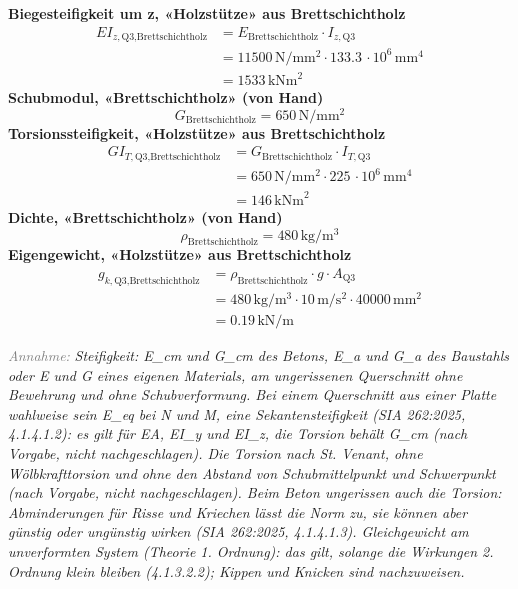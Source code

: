 \documentclass[11pt,a4paper]{article}
\newcommand{\hinweis}[2]{\par\noindent\textcolor{gray}{\textit{#1:}} \textit{#2}\par}
\begin{document}
\noindent\textbf{Biegesteifigkeit um z, «Holzstütze» aus Brettschichtholz}
\begin{equation*}
\begin{aligned}
  EI_{z,\text{Q3,Brettschichtholz}} &= E_{\text{Brettschichtholz}} \cdot I_{z,\text{Q3}} \\
  &= 11500\,\mathrm{N}/\mathrm{mm}^{2} \cdot 133.3\,\cdot 10^{6}\,\mathrm{mm}^{4} \\
  &= 1533\,\mathrm{kNm}^{2}
\end{aligned}
\end{equation*}
\noindent\textbf{Schubmodul, «Brettschichtholz» (von Hand)}
\begin{equation*}
G_{\text{Brettschichtholz}} = 650\,\mathrm{N}/\mathrm{mm}^{2}
\end{equation*}
\noindent\textbf{Torsionssteifigkeit, «Holzstütze» aus Brettschichtholz}
\begin{equation*}
\begin{aligned}
  GI_{T,\text{Q3,Brettschichtholz}} &= G_{\text{Brettschichtholz}} \cdot I_{T,\text{Q3}} \\
  &= 650\,\mathrm{N}/\mathrm{mm}^{2} \cdot 225\,\cdot 10^{6}\,\mathrm{mm}^{4} \\
  &= 146\,\mathrm{kNm}^{2}
\end{aligned}
\end{equation*}
\noindent\textbf{Dichte, «Brettschichtholz» (von Hand)}
\begin{equation*}
\rho_{\text{Brettschichtholz}} = 480\,\mathrm{kg}/\mathrm{m}^{3}
\end{equation*}
\noindent\textbf{Eigengewicht, «Holzstütze» aus Brettschichtholz}
\begin{equation*}
\begin{aligned}
  g_{k,\text{Q3,Brettschichtholz}} &= \rho_{\text{Brettschichtholz}} \cdot g \cdot A_{\text{Q3}} \\
  &= 480\,\mathrm{kg}/\mathrm{m}^{3} \cdot 10\,\mathrm{m}/\mathrm{s}^{2} \cdot 40000\,\mathrm{mm}^{2} \\
  &= 0.19\,\mathrm{kN}/\mathrm{m}
\end{aligned}
\end{equation*}
\hinweis{Annahme}{Steifigkeit: E\_cm und G\_cm des Betons, E\_a und G\_a des Baustahls oder E und G eines eigenen Materials, am ungerissenen Querschnitt ohne Bewehrung und ohne Schubverformung. Bei einem Querschnitt aus einer Platte wahlweise sein E\_eq bei N und M, eine Sekantensteifigkeit (SIA 262:2025, 4.1.4.1.2): es gilt für EA, EI\_y und EI\_z, die Torsion behält G\_cm (nach Vorgabe, nicht nachgeschlagen). Die Torsion nach St. Venant, ohne Wölbkrafttorsion und ohne den Abstand von Schubmittelpunkt und Schwerpunkt (nach Vorgabe, nicht nachgeschlagen). Beim Beton ungerissen auch die Torsion: Abminderungen für Risse und Kriechen lässt die Norm zu, sie können aber günstig oder ungünstig wirken (SIA 262:2025, 4.1.4.1.3). Gleichgewicht am unverformten System (Theorie 1. Ordnung): das gilt, solange die Wirkungen 2. Ordnung klein bleiben (4.1.3.2.2); Kippen und Knicken sind nachzuweisen.}
\end{document}
